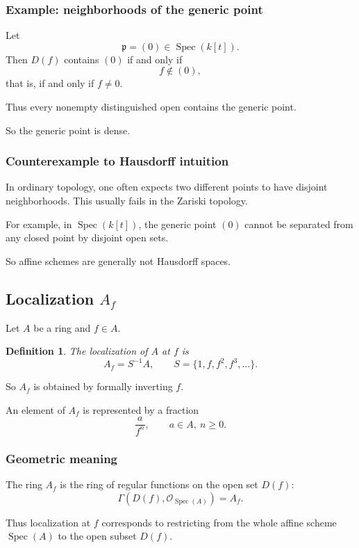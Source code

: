 \documentclass[12pt,a4paper]{article}
\theoremstyle{notespace}
\newtheorem{definition}{Definition}[section]
\newcommand{\Spec}{\operatorname{Spec}}
\newcommand{\OO}{\mathcal O}
\newcommand{\mf}{\mathfrak}
\theoremstyle{definition}
\begin{document}
\subsubsection{Example: neighborhoods of the generic point}

Let
\[
\mf p=(0)\in \Spec(k[t]).
\]
Then \(D(f)\) contains \((0)\) if and only if
\[
f\notin (0),
\]
that is, if and only if \(f\neq 0\).

Thus every nonempty distinguished open contains the generic point.

So the generic point is dense.

\subsubsection{Counterexample to Hausdorff intuition}

In ordinary topology, one often expects two different points to have disjoint neighborhoods. This usually fails in the Zariski topology.

For example, in \(\Spec(k[t])\), the generic point \((0)\) cannot be separated from any closed point by disjoint open sets.

So affine schemes are generally not Hausdorff spaces.

\subsection{Localization \(A_f\)}

Let \(A\) be a ring and \(f\in A\).

\begin{definition}
	The \emph{localization of \(A\) at \(f\)} is
	\[
	A_f=S^{-1}A,
	\qquad
	S=\{1,f,f^2,f^3,\dots\}.
	\]
\end{definition}

So \(A_f\) is obtained by formally inverting \(f\).

An element of \(A_f\) is represented by a fraction
\[
\frac{a}{f^n},
\qquad
a\in A,\ n\geq 0.
\]

\subsubsection{Geometric meaning}

The ring \(A_f\) is the ring of regular functions on the open set \(D(f)\):
\[
\Gamma(D(f),\OO_{\Spec(A)})=A_f.
\]

Thus localization at \(f\) corresponds to restricting from the whole affine scheme \(\Spec(A)\) to the open subset \(D(f)\).
\end{document}
